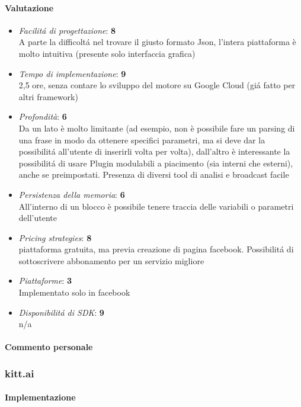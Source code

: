 \documentclass[]{article}
\begin{document}
\paragraph{Valutazione}
\begin{itemize}
\item \textit{Facilitá di progettazione}: \textbf{8} \\ A parte la difficoltá nel trovare il giusto formato Json, l’intera piattaforma è molto intuitiva (presente solo interfaccia grafica)
\item \textit{Tempo di implementazione}: \textbf{9} \\ 2,5 ore, senza contare lo sviluppo del motore su Google Cloud (giá fatto per altri framework)
\item \textit{Profondità}: \textbf{6} \\ Da un lato è molto limitante (ad esempio, non è possibile fare un parsing di una frase in modo da ottenere specifici parametri, ma si deve dar la possibilitá all’utente di inserirli volta per volta), dall’altro è interessante la possibilitá di usare Plugin modulabili a piacimento (sia interni che esterni), anche se preimpostati. Presenza di diversi tool di analisi e broadcast facile
\item \textit{Persistenza della memoria}: \textbf{6} \\  All’interno di un blocco è possibile tenere traccia delle variabili o parametri dell’utente
\item \textit{Pricing strategies}: \textbf{8} \\  piattaforma gratuita, ma previa creazione di pagina facebook. Possibilitá di sottoscrivere abbonamento per un servizio migliore
\item \textit{Piattaforme}: \textbf{3} \\ Implementato solo in facebook
\item \textit{Disponibilitá di SDK}: \textbf{9} \\ n/a
\end{itemize}
\paragraph{Commento personale}

\subsubsection{kitt.ai}
\paragraph{Implementazione}
\end{document}
